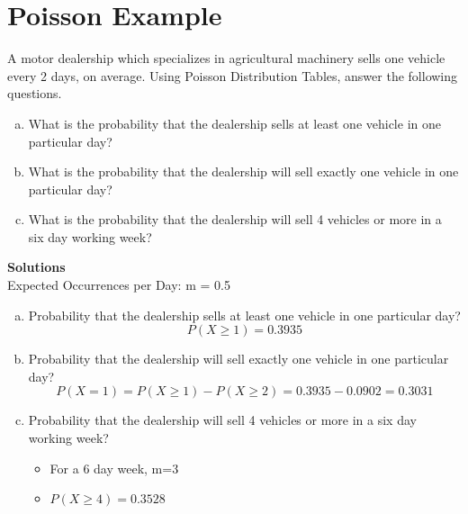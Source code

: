 \documentclass[a4paper,12pt]{article}
\begin{document}

\section*{Poisson Example}
A motor dealership which specializes in agricultural machinery sells one vehicle every 2 days, on average. Using Poisson Distribution Tables, answer the following questions.
\begin{enumerate}[(a)]
\item   What is the probability that the dealership sells at least one vehicle in one particular day?
\item   What is the probability that the dealership will sell exactly one vehicle in one particular day?
\item   What is the probability that the dealership will sell 4 vehicles or more in a six day working week?
\end{enumerate}



\noindent \textbf{Solutions}\\
Expected Occurrences per Day: m = 0.5
\begin{enumerate}[(a)]
 
\item  Probability that the dealership sells at least one vehicle in one particular day?
\[ P(X \geq 1) = 0.3935 \]
\item  Probability that the dealership will sell exactly one vehicle in one particular day?
\[ P(X = 1) = P(X \geq 1) - P(X \geq 2)  = 0.3935 - 0.0902 = 0.3031\]
\item  Probability that the dealership will sell 4 vehicles or more in a six day working week?
\begin{itemize}
\item  For a 6 day week, m=3
\item  $P(X \geq 4) = 0.3528$
\end{itemize}
\end{enumerate}
\end{document}
